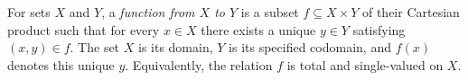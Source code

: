 
For sets $X$ and $Y$, a \emph{function from $X$ to $Y$} is a subset $f\subseteq X\times Y$ of their Cartesian product such that for every $x\in X$ there exists a unique $y\in Y$ satisfying $(x,y)\in f$. The set $X$ is its domain, $Y$ is its specified codomain, and $f(x)$ denotes this unique $y$. Equivalently, the relation $f$ is total and single-valued on $X$.
